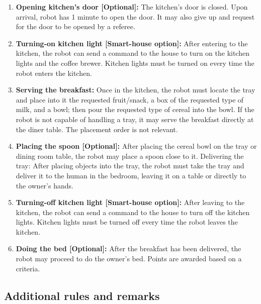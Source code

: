 \begin{enumerate}
\item \textbf{Opening kitchen's door [Optional]:} The kitchen's door is closed. Upon arrival, robot has 1 minute to open the door. It may also give up and request for the door to be opened by a referee.

\item \textbf{Turning-on kitchen light [Smart-house option]:} After entering to the kitchen, the robot can send a command to the house to turn on the kitchen lights and the coffee brewer. Kitchen lights must be turned on every time the robot enters the kitchen.

\item \textbf{Serving the breakfast:} Once in the kitchen, the robot must locate the tray and place into it the requested fruit/snack, a box of the requested type of milk, and a bowl; then pour the requested type of cereal into the bowl. If the robot is not capable of handling a tray, it may serve the breakfast directly at the diner table. The placement order is not relevant.

\item \textbf{Placing the spoon [Optional]:} After placing the cereal bowl on the tray or dining room table, the robot may place a spoon close to it.
Delivering the tray: After placing objects into the tray, the robot must take the tray and deliver it to the human in the bedroom, leaving it on a table or directly to the owner's hands.

\item \textbf{Turning-off kitchen light [Smart-house option]:} After leaving to the kitchen, the robot can send a command to the house to turn off the kitchen lights. Kitchen lights must be turned off every time the robot leaves the kitchen.

\item \textbf{Doing the bed [Optional]:} After the breakfast has been delivered, the robot may proceed to do the owner's bed. Points are awarded based on a  criteria.

\end{enumerate}

\subsection{Additional rules and remarks}

